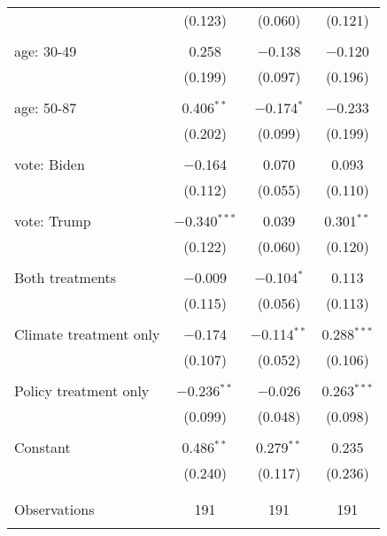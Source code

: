 \begin{tabular}{@{\extracolsep{5pt}}lccc}
  & (0.123) & (0.060) & (0.121) \\ 
  & & & \\ 
 age: 30-49 & 0.258 & $-$0.138 & $-$0.120 \\ 
  & (0.199) & (0.097) & (0.196) \\ 
  & & & \\ 
 age: 50-87 & 0.406$^{**}$ & $-$0.174$^{*}$ & $-$0.233 \\ 
  & (0.202) & (0.099) & (0.199) \\ 
  & & & \\ 
 vote: Biden & $-$0.164 & 0.070 & 0.093 \\ 
  & (0.112) & (0.055) & (0.110) \\ 
  & & & \\ 
 vote: Trump & $-$0.340$^{***}$ & 0.039 & 0.301$^{**}$ \\ 
  & (0.122) & (0.060) & (0.120) \\ 
  & & & \\ 
 Both treatments & $-$0.009 & $-$0.104$^{*}$ & 0.113 \\ 
  & (0.115) & (0.056) & (0.113) \\ 
  & & & \\ 
 Climate treatment only & $-$0.174 & $-$0.114$^{**}$ & 0.288$^{***}$ \\ 
  & (0.107) & (0.052) & (0.106) \\ 
  & & & \\ 
 Policy treatment only & $-$0.236$^{**}$ & $-$0.026 & 0.263$^{***}$ \\ 
  & (0.099) & (0.048) & (0.098) \\ 
  & & & \\ 
 Constant & 0.486$^{**}$ & 0.279$^{**}$ & 0.235 \\ 
  & (0.240) & (0.117) & (0.236) \\ 
  & & & \\ 
\hline \\[-1.8ex] 

Observations & 191 & 191 & 191 \\ 
\hline 
\hline \\[-1.8ex] 
\end{tabular} 